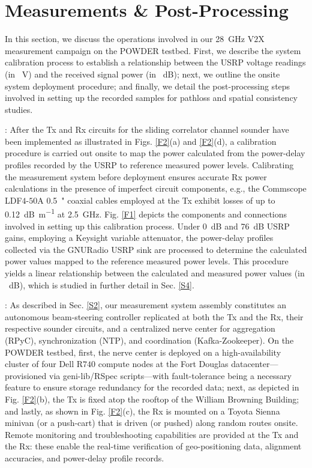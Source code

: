 \documentclass[10pt, twocolumn]{IEEEtran}
\begin{document}
\section{Measurements \& Post-Processing}\label{S3}
In this section, we discuss the operations involved in our \SI{28}{\giga\hertz} V$2$X measurement campaign on the POWDER testbed. First, we describe the system calibration process to establish a relationship between the USRP voltage readings (in \SI{}{\volt}) and the received signal power (in \SI{}{\deci\bel}); next, we outline the onsite system deployment procedure; and finally, we detail the post-processing steps involved in setting up the recorded samples for pathloss and spatial consistency studies.

: After the Tx and Rx circuits for the sliding correlator channel sounder have been implemented as illustrated in Figs. \ref{F2}(a) and \ref{F2}(d), a calibration procedure is carried out onsite to map the power calculated from the power-delay profiles recorded by the USRP to reference measured power levels. Calibrating the measurement system before deployment ensures accurate Rx power calculations in the presence of imperfect circuit components, e.g., the Commscope LDF$4$-$50$A \SI{0.5}{{"}} coaxial cables employed at the Tx exhibit losses of up to \SI{0.12}{\deci\bel\per\meter} at \SI{2.5}{\giga\hertz}. Fig. \ref{F1} depicts the components and connections involved in setting up this calibration process. Under \SI{0}{\deci\bel} and \SI{76}{\deci\bel} USRP gains, employing a Keysight variable attenuator, the power-delay profiles collected via the GNURadio USRP sink are processed to determine the calculated power values mapped to the reference measured power levels. This procedure yields a linear relationship between the calculated and measured power values (in \SI{}{\deci\bel}), which is studied in further detail in Sec. \ref{S4}.

: As described in Sec. \ref{S2}, our measurement system assembly constitutes an autonomous beam-steering controller replicated at both the Tx and the Rx, their respective sounder circuits, and a centralized nerve center for aggregation (RPyC), synchronization (NTP), and coordination (Kafka-Zookeeper). On the POWDER testbed, first, the nerve center is deployed on a high-availability cluster of four Dell R$740$ compute nodes at the Fort Douglas datacenter---provisioned via geni-lib/RSpec scripts---with fault-tolerance being a necessary feature to ensure storage redundancy for the recorded data; next, as depicted in Fig. \ref{F2}(b), the Tx is fixed atop the rooftop of the William Browning Building; and lastly, as shown in Fig. \ref{F2}(c), the Rx is mounted on a Toyota Sienna minivan (or a push-cart) that is driven (or pushed) along random routes onsite. Remote monitoring and troubleshooting capabilities are provided at the Tx and the Rx: these enable the real-time verification of geo-positioning data, alignment accuracies, and power-delay profile records.
\end{document}
